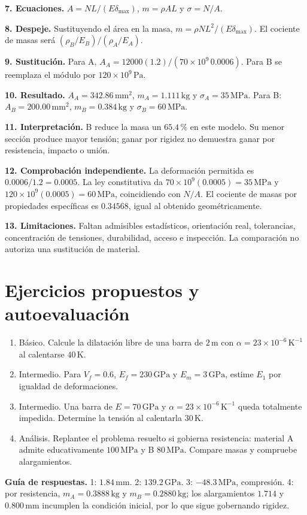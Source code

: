 \textbf{7. Ecuaciones.} $A=NL/(E\delta_{\max})$, $m=\rho AL$ y $\sigma=N/A$.

\textbf{8. Despeje.} Sustituyendo el área en la masa, $m=\rho NL^2/(E\delta_{\max})$. El cociente de masas será $(\rho_B/E_B)/(\rho_A/E_A)$.

\textbf{9. Sustitución.} Para A, $A_A=12000(1.2)/(70\times10^9\,0.0006)$. Para B se reemplaza el módulo por $120\times10^9\,\mathrm{Pa}$.

\textbf{10. Resultado.} $A_A=342.86\,\mathrm{mm^2}$, $m_A=1.111\,\mathrm{kg}$ y $\sigma_A=35\,\mathrm{MPa}$. Para B: $A_B=200.00\,\mathrm{mm^2}$, $m_B=0.384\,\mathrm{kg}$ y $\sigma_B=60\,\mathrm{MPa}$.

\textbf{11. Interpretación.} B reduce la masa un $65.4\,\text{\%}$ en este modelo. Su menor sección produce mayor tensión; ganar por rigidez no demuestra ganar por resistencia, impacto o unión.

\textbf{12. Comprobación independiente.} La deformación permitida es $0.0006/1.2=0.0005$. La ley constitutiva da $70\times10^9(0.0005)=35\,\mathrm{MPa}$ y $120\times10^9(0.0005)=60\,\mathrm{MPa}$, coincidiendo con $N/A$. El cociente de masas por propiedades específicas es $0.34568$, igual al obtenido geométricamente.

\textbf{13. Limitaciones.} Faltan admisibles estadísticos, orientación real, tolerancias, concentración de tensiones, durabilidad, acceso e inspección. La comparación no autoriza una sustitución de material.

\section{Ejercicios propuestos y autoevaluación}
\begin{enumerate}
\item Básico. Calcule la dilatación libre de una barra de $2\,\mathrm{m}$ con $\alpha=23\times10^{-6}\,\mathrm{K^{-1}}$ al calentarse $40\,\mathrm{K}$.
\item Intermedio. Para $V_f=0.6$, $E_f=230\,\mathrm{GPa}$ y $E_m=3\,\mathrm{GPa}$, estime $E_1$ por igualdad de deformaciones.
\item Intermedio. Una barra de $E=70\,\mathrm{GPa}$ y $\alpha=23\times10^{-6}\,\mathrm{K^{-1}}$ queda totalmente impedida. Determine la tensión al calentarla $30\,\mathrm{K}$.
\item Análisis. Replantee el problema resuelto si gobierna resistencia: material A admite educativamente $100\,\mathrm{MPa}$ y B $80\,\mathrm{MPa}$. Compare masas y compruebe alargamientos.
\end{enumerate}
\textbf{Guía de respuestas.} 1: $1.84\,\mathrm{mm}$. 2: $139.2\,\mathrm{GPa}$. 3: $-48.3\,\mathrm{MPa}$, compresión. 4: por resistencia, $m_A=0.3888\,\mathrm{kg}$ y $m_B=0.2880\,\mathrm{kg}$; los alargamientos $1.714$ y $0.800\,\mathrm{mm}$ incumplen la condición inicial, por lo que sigue gobernando rigidez.

